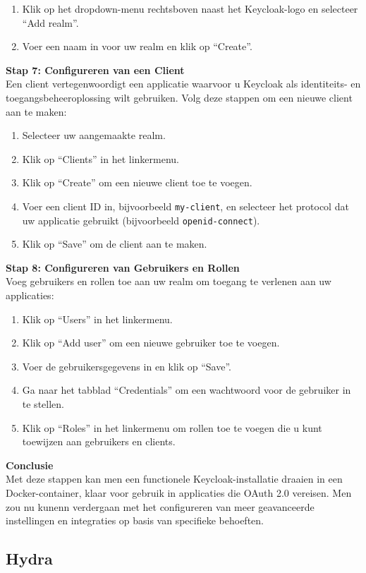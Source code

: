 \begin{enumerate}
    \item Klik op het dropdown-menu rechtsboven naast het Keycloak-logo en selecteer ``Add realm''.
    \item Voer een naam in voor uw realm en klik op ``Create''.
\end{enumerate}
\textbf{Stap 7: Configureren van een Client}\\
Een client vertegenwoordigt een applicatie waarvoor u Keycloak als identiteits- en toegangsbeheeroplossing wilt gebruiken. Volg deze stappen om een nieuwe client aan te maken:
\begin{enumerate}
    \item Selecteer uw aangemaakte realm.
    \item Klik op ``Clients'' in het linkermenu.
    \item Klik op ``Create'' om een nieuwe client toe te voegen.
    \item Voer een client ID in, bijvoorbeeld \texttt{my-client}, en selecteer het protocol dat uw applicatie gebruikt (bijvoorbeeld \texttt{openid-connect}).
    \item Klik op ``Save'' om de client aan te maken.
\end{enumerate}
\textbf{Stap 8: Configureren van Gebruikers en Rollen}\\
Voeg gebruikers en rollen toe aan uw realm om toegang te verlenen aan uw applicaties:
\begin{enumerate}
    \item Klik op ``Users'' in het linkermenu.
    \item Klik op ``Add user'' om een nieuwe gebruiker toe te voegen.
    \item Voer de gebruikersgegevens in en klik op ``Save''.
    \item Ga naar het tabblad ``Credentials'' om een wachtwoord voor de gebruiker in te stellen.
    \item Klik op ``Roles'' in het linkermenu om rollen toe te voegen die u kunt toewijzen aan gebruikers en clients.
\end{enumerate}
\textbf{Conclusie}\\
Met deze stappen kan men een functionele Keycloak-installatie draaien in een Docker-container, klaar voor gebruik in applicaties die OAuth 2.0 vereisen. Men zou nu kunenn verdergaan met het configureren van meer geavanceerde instellingen en integraties op basis van specifieke behoeften.


\subsection{Hydra}%
\label{subsec:hydra}
